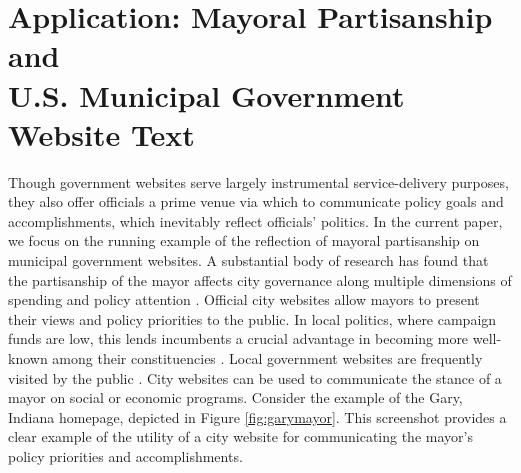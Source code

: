 \documentclass[11pt]{article}
\begin{document}


\vspace{-.2cm}

\section{Application: Mayoral Partisanship and \\ U.S. Municipal Government Website Text} \vspace{-.2cm}


 Though government websites serve largely instrumental service-delivery purposes, they also offer officials a prime venue via which to communicate policy goals and accomplishments, which inevitably reflect officials' politics. In the current paper, we focus on the running example of the reflection of mayoral partisanship on municipal government websites. A substantial body of research has found that the partisanship of the mayor affects city governance along multiple dimensions of spending and policy attention \citep{gerber2011mayors,de2016mayoral,einstein2016mayors,marion2013mayor}. Official city websites allow mayors to present their views and policy priorities to the public. In local politics, where campaign funds are low, this lends incumbents a crucial advantage in becoming more well-known among their constituencies \citep{stanyer2008elected}. Local government websites are frequently visited by the public \citep{thomas2003new}. City websites can be used to communicate the stance of a mayor on social or economic programs. Consider the example of the Gary, Indiana homepage, depicted in Figure \ref{fig:garymayor}.  This screenshot provides a clear example of the utility of a city website for communicating the mayor's policy priorities and accomplishments.
 
\end{document}
